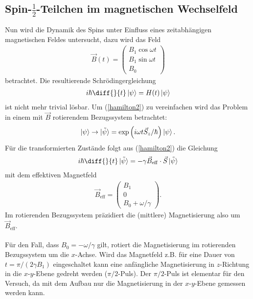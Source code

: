 \subsection{Spin-$\frac{1}{2}$-Teilchen im magnetischen Wechselfeld}
Nun wird die Dynamik des Spins unter Einfluss eines zeitabhängigen magnetischen Feldes untersucht, dazu wird das Feld 
\begin{align*}
  \vec{B}(t)= \left( \begin{array}{c}
                    B_1\cos\omega t\\
                    B_1\sin \omega t \\
                    B_0
                  \end{array} \right)
\end{align*}
betrachtet. Die resultierende Schrödingergleichung
\begin{align}
i\hbar \diff{}{t} \ket{\psi}=H(t)\ket{\psi} \label{hamilton2}
\end{align}
ist nicht mehr trivial lösbar. Um (\ref{hamilton2}) zu vereinfachen wird das Problem in einem mit $\vec{B}$ rotierendem Bezugssystem betrachtet:
\begin{align*}
  \ket{\psi} \rightarrow \ket{\tilde{\psi}}=\exp \left(  i\omega t \vec{S}_z/\hbar\right) \ket{\psi}.
\end{align*}
Für die transformierten Zustände folgt aus (\ref{hamilton2}) die Gleichung
\begin{align*}
  i\hbar \diff{}{t}\ket{\tilde{\psi}}= -\gamma \vec{B}_\mathrm{eff} \cdot \vec{S} \ket{\tilde{\psi}}
\end{align*}
mit dem effektiven Magnetfeld 
\begin{align*}
  \vec{B}_\mathrm{eff}=\left( \begin{array}{c}
                    B_1\\
                    0\\
                    B_0+\omega/\gamma
                  \end{array} \right).
\end{align*}
Im rotierenden Bezugssystem präzidiert die (mittlere) Magnetisierung also um $\vec{B}_\mathrm{eff}$. \\ \\
Für den Fall, dass $B_0=-\omega/\gamma$ gilt, rotiert die Magnetisierung im rotierenden Bezugssystem um die $x$-Achse. Wird das Magnetfeld z.B. für eine Dauer von $t=\pi/(2\gamma B_1)$ eingeschaltet kann eine anfängliche Magnetisierung in $z$-Richtung in die $x$-$y$-Ebene gedreht werden ($\pi/2$-Puls). Der $\pi/2$-Puls ist elementar für den Versuch, da mit dem Aufbau nur die Magnetisierung in der $x$-$y$-Ebene gemessen werden kann. \\ \\
